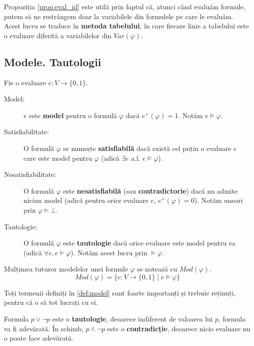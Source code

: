 Propoziția \ref{prop:eval_id} este utilă prin faptul că, atunci când evaluăm formule, putem să ne restrângem doar la variabilele
din formulele pe care le evaluăm. Acest lucru se traduce în \textbf{metoda tabelului}, în care fiecare linie a tabelului este
o evaluare diferită a variabilelor din \( Var(\varphi) \).

\subsection{Modele. Tautologii}

\begin{definition}
	\label{def:model}
	Fie o evaluare \( e : V \to \{0, 1 \} \).

	\begin{description}
		\item[Model:] \( e \) este \textbf{model} pentru o formulă \( \varphi \) dacă \( e^+(\varphi) = 1 \). Notăm \( e \models \varphi \).
		\item[Satisfiabilitate:] O formulă \( \varphi \) se numește \textbf{satisfiabilă} dacă există cel puțin o evaluare \( e \) care este model pentru \( \varphi \) (adică \( \exists e \) a.î. \( e \models \varphi \)).
		\item[Nesatisfiabilitate:] O formulă \( \varphi \) este \textbf{nesatisfiabilă} (sau \textbf{contradictorie}) dacă nu admite niciun model (adică pentru orice evaluare \( e \), \( e^+(\varphi) = 0 \)). Notăm uneori prin \( \varphi \models \bot \).
		\item[Tautologie:] O formulă \( \varphi \) este \textbf{tautologie} dacă orice evaluare este model pentru ea (adică \( \forall e, e \models \varphi \)). Notăm acest lucru prin \( \models \varphi \).
	\end{description}

\end{definition}

\begin{notation}
	Mulțimea tuturor modelelor unei formule \( \varphi \) se notează cu \( Mod(\varphi) \).
	\[ Mod(\varphi) = \{ e : V \to \{0, 1\} \mid e \models \varphi \} \]
\end{notation}

Toți termenii definiți în \ref{def:model} sunt foarte importanți și trebuie reținuți, pentru că o să tot lucrați cu ei.

\begin{eg}
	Formula \( p \lor \neg p \) este o \textbf{tautologie}, deoarece indiferent de valoarea lui \( p \), formula va fi adevărată. În schimb, \( p \land \neg p \) este o \textbf{contradicție}, deoarece nicio evaluare nu o poate face adevărată.
\end{eg}

